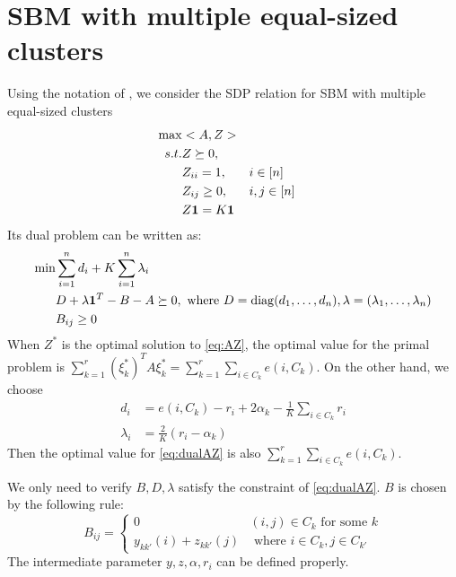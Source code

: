 \documentclass{article}
\DeclareMathOperator{\diag}{diag}
\begin{document}
\section{SBM with multiple equal-sized clusters}
Using the notation of \cite{hajek2016achieving}, we consider the SDP relation for SBM with multiple equal-sized clusters
\begin{align}
\max & <A,Z> \notag \\
s.t. & Z \succeq 0, \notag\\
&Z_{ii} = 1,  && i \in [n] \notag\\
&Z_{ij} \geq 0, && i,j \in [n] \notag\\
&Z \mathbf{1} = K\mathbf{1} \label{eq:AZ}
\end{align}
Its dual problem can be written as:
\begin{align}
\min & \sum_{i=1}^n d_i + K \sum_{i=1}^n \lambda_i\notag \\
& D + \lambda \mathbf{1}^T - B - A \succeq 0, \textrm{ where } D=\diag(d_1, \dots, d_n), \lambda=(\lambda_1, \dots, \lambda_n) \notag \\
& B_{ij} \geq 0\label{eq:dualAZ}
\end{align}
When $Z^*$ is the optimal solution to \eqref{eq:AZ}, the optimal value for the primal problem is $\sum_{k=1}^r (\xi^*_k)^T A \xi^*_k
= \sum_{k=1}^r\sum_{i \in C_k} e(i, C_k) $. On the other hand, we choose
\begin{align}
d_i &= e(i, C_k) - r_i + 2\alpha_k  - \frac{1}{K} \sum_{i \in C_k} r_i \\
\lambda_i &= \frac{2}{K}(r_i - \alpha_k)
\end{align}
Then the optimal value for \eqref{eq:dualAZ} is also $\sum_{k=1}^r\sum_{i \in C_k} e(i, C_k) $.

We only need to verify $B, D, \lambda$ satisfy the constraint of \eqref{eq:dualAZ}.
$B$ is chosen by the following rule:
\begin{equation}
B_{ij} = \begin{cases}
0 & (i,j) \in C_k \textrm{ for some } k \\
y_{kk'}(i) + z_{kk'}(j) & \textrm{ where } i \in C_k, j \in C_{k'}
\end{cases}
\end{equation}
The intermediate parameter $y,z,\alpha,r_i$ can be defined properly.


	
\end{document}
